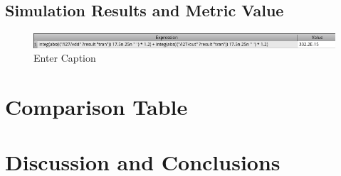 \documentclass[12pt]{article}
\begin{document}
\newpage

\subsection{Simulation Results and Metric Value}

\begin{figure}
    \centering
    \includegraphics[width=0.5\linewidth]{writeup//figures/optimized_energy_val.png}
    \caption{Enter Caption}
\end{figure}
\newpage

\section{Comparison Table}



\newpage

\section{Discussion and Conclusions}
\end{document}
